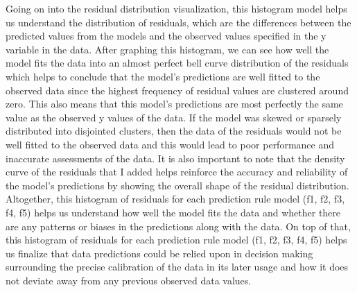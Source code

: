 \documentclass[
  letterpaper,
  DIV=11,
  numbers=noendperiod]{scrreprt}
\begin{document}
Going on into the residual distribution visualization, this histogram
model helps us understand the distribution of residuals, which are the
differences between the predicted values from the models and the
observed values specified in the y variable in the data. After graphing
this histogram, we can see how well the model fits the data into an
almost perfect bell curve distribution of the residuals which helps to
conclude that the model's predictions are well fitted to the observed
data since the highest frequency of residual values are clustered around
zero. This also means that this model's predictions are most perfectly
the same value as the observed y values of the data. If the model was
skewed or sparsely distributed into disjointed clusters, then the data
of the residuals would not be well fitted to the observed data and this
would lead to poor performance and inaccurate assessments of the data.
It is also important to note that the density curve of the residuals
that I added helps reinforce the accuracy and reliability of the model's
predictions by showing the overall shape of the residual distribution.
Altogether, this histogram of residuals for each prediction rule model
(f1, f2, f3, f4, f5) helps us understand how well the model fits the
data and whether there are any patterns or biases in the predictions
along with the data. On top of that, this histogram of residuals for
each prediction rule model (f1, f2, f3, f4, f5) helps us finalize that
data predictions could be relied upon in decision making surrounding the
precise calibration of the data in its later usage and how it does not
deviate away from any previous observed data values.
\end{document}
